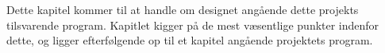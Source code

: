Dette kapitel kommer til at handle om designet angående dette projekts tilsvarende program. Kapitlet kigger på de mest væsentlige punkter indenfor dette, og ligger efterfølgende op til et kapitel angående projektets program.